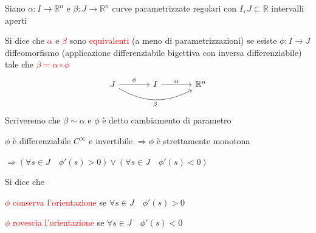         \begin{definizione}
        Siano $\alpha: I \to \mathbb{R}^n$ e $\beta: J \to \mathbb{R}^n$ curve parametrizzate regolari con $I,J \subset \mathbb{R}$ intervalli aperti

        Si dice che \textcolor{red}{$\alpha$} e \textcolor{red}{$\beta$} sono \textcolor{red}{equivalenti} \textcolor{blu}{(a meno di parametrizzazioni)} 
        se esiste $\phi: I \to J$ diffeomorfismo \textcolor{blu}{(applicazione differenziabile bigettiva con inversa differenziabile)} tale che \textcolor{red}{$\beta = \alpha \circ \phi$}
        \begin{equation*}
        \begin{tikzcd}[row sep=large, column sep=large]
        J \arrow[r, "\phi"] \arrow[rr, bend right, "\beta"'] & I \arrow[r, "\alpha"] & \mathbb{R}^n
        \end{tikzcd}
        \end{equation*}
        Scriveremo che $\beta \sim \alpha$ e $\phi$ è detto cambiamento di parametro
        \end{definizione}
        \begin{osservazione}
        $\phi$ è differenziabile $C^\infty$ e invertibile $\Rightarrow \phi$ è strettamente monotona 
        
        $\Rightarrow \left( \forall s \in J \quad \phi'(s) > 0 \right) \lor \left( \forall s \in J \quad \phi'(s) < 0 \right)$
        \end{osservazione}
        \begin{definizione}
        Si dice che 

        \textcolor{red}{$\phi$ conserva l'orientazione} se $\forall s \in J \quad \phi'(s) > 0$ 

        \textcolor{red}{$\phi$ rovescia l'orientazione} se $\forall s \in J \quad \phi'(s) < 0$
        \end{definizione}
